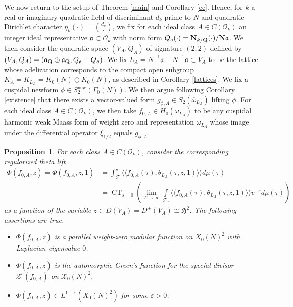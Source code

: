 \documentclass{amsart}
\newtheorem{proposition}[theorem]{Proposition}
\theoremstyle{definition}
\theoremstyle{definition}
\theoremstyle{definition}
\begin{document}
We now return to the setup of Theorem \ref{main} and Corollary \ref{ec}.
Hence, for $k$ a real or imaginary quadratic field of discriminant $d_k$ prime to $N$ and 
quadratic Dirichlet character $\eta_k (\cdot) = (\frac{d_k}{\cdot})$, 
we fix for each ideal class $A \in C(\mathcal{O}_k)$
an integer ideal representative $\mathfrak{a}\subset \mathcal{O}_k$
with norm form $Q_{\mathfrak{a}}(\cdot) = {\bf{N}}_{k/{\bf{Q}}}(\cdot)/{\bf{N}} \mathfrak{a}$. We then
consider the quadratic space $(V_A, Q_A)$ of signature $(2,2)$ defined by 
$(V_A, Q_A) = (\mathfrak{a}_{\bf{Q}} \oplus \mathfrak{a}_{\bf{Q}}, Q_{\mathfrak{a}} - Q_{\mathfrak{a}})$.
We fix $L_A = N^{-1}\mathfrak{a} + N^{-1} \mathfrak{a} \subset V_A$ to be the lattice whose adelization
corresponds to the compact open subgroup $K_A = K_{L_A} = K_0(N) \oplus K_0(N)$, as described in Corollary \ref{lattices}.
We fix a cuspidal newform $\phi \in S_2^{\operatorname{new}}(\Gamma_0(N))$.
We then argue following Corollary \ref{existence} that there exists a vector-valued form $g_{\phi, A} \in S_2(\overline{\omega}_{L_A})$
lifting $\phi$. For each ideal class $A \in C(\mathcal{O}_k)$, we then take $f_{0, A} \in H_0(\omega_{L_A})$ to be
any cuspidal harmonic weak Maass form of weight zero and representation $\omega_{L_A}$ 
whose image under the differential operator $\xi_{1/2}$ equals $g_{\phi, A}$.

\begin{proposition}

For each class $A \in C(\mathcal{O}_k)$, consider the corresponding regularized theta lift 
\begin{align*} \Phi(f_{0, A}, z) = \Phi(f_{0, A}, z, 1) 
&= \int_{\mathcal{F}}^{\star} \langle \langle f_{0, A}(\tau), \theta_{L_A}(\tau, z, 1) \rangle \rangle d \mu(\tau) \\
&= \operatorname{CT}_{s=0} \left( \lim_{T \rightarrow \infty} \int\limits_{\mathcal{F}_T}
\langle \langle f_{0, A}(\tau), \theta_{L_A}(\tau, z, 1) \rangle \rangle v^{-s} d \mu(\tau) \right) \end{align*}
as a function of the variable $z \in D(V_A) = D^{\pm}(V_A) \cong \mathfrak{H}^2$. The following assertions are true. 

\begin{itemize}

\item[(i)] $\Phi(f_{0, A}, z)$ is a parallel weight-zero modular function on $X_0(N)^2$ with Laplacian eigenvalue $0$. 

\item[(ii)] $\Phi(f_{0, A}, z)$ is the automorphic Green's function for the special divisor $\mathcal{Z}^c(f_{0, A})$ on $\mathcal{X}_0(N)^2$. 

\item[(iii)] $\Phi(f_{0, A}, z) \in L^{1+\varepsilon}(X_0(N)^2)$ for some $\varepsilon >0$. 

\end{itemize}

\end{proposition}
\end{document}

